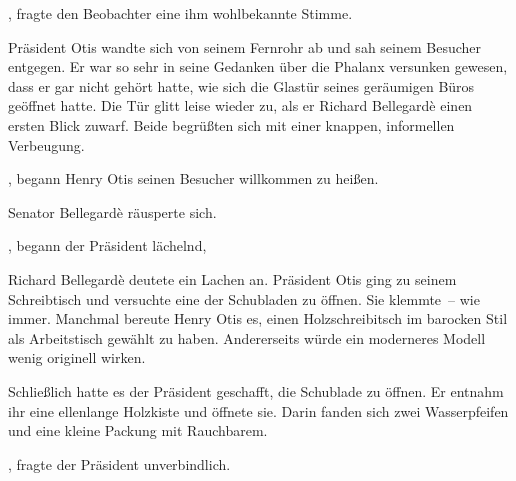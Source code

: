 \par

, fragte den Beobachter eine ihm wohlbekannte Stimme.

\par

Präsident Otis wandte sich von seinem Fernrohr ab und sah seinem Besucher entgegen. Er war so sehr in seine Gedanken über die Phalanx versunken gewesen, dass er gar nicht gehört hatte, wie sich die Glastür seines geräumigen Büros geöffnet hatte. Die Tür glitt leise wieder zu, als er Richard Bellegardè einen ersten Blick zuwarf. Beide begrüßten sich mit einer knappen, informellen Verbeugung.

\par

, begann Henry Otis seinen Besucher willkommen zu heißen. 

\par

Senator Bellegardè räusperte sich. 

\par

, begann der Präsident lächelnd, 

\par

Richard Bellegardè deutete ein Lachen an. Präsident Otis ging zu seinem Schreibtisch und versuchte eine der Schubladen zu öffnen. Sie klemmte~-- wie immer. Manchmal bereute Henry Otis es, einen Holzschreibitsch im barocken Stil als Arbeitstisch gewählt zu haben. Andererseits würde ein moderneres Modell wenig originell wirken.

\par

Schließlich hatte es der Präsident geschafft, die Schublade zu öffnen. Er entnahm ihr eine ellenlange Holzkiste und öffnete sie. Darin fanden sich zwei Wasserpfeifen und eine kleine Packung mit Rauchbarem.

\par

, fragte der Präsident unverbindlich.

\par

